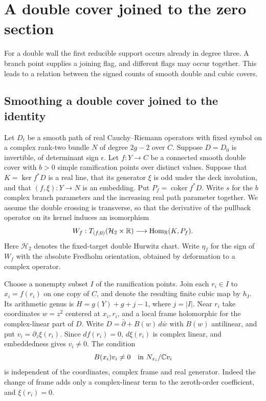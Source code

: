 \section{A double cover joined to the zero section}\label{sec:cubic}
For a double wall the first reducible support occurs already in degree three. A branch point supplies a joining flag, and different flags may occur together. This leads to a relation between the signed counts of smooth double and cubic covers.
\subsection{Smoothing a double cover joined to the identity}\label{p10-sec:nodes}

Let $D_t$ be a smooth path of real Cauchy--Riemann operators with fixed
symbol on a complex rank-two bundle $N$ of degree $2g-2$ over $C$.
Suppose $D=D_0$ is invertible, of determinant sign $\epsilon$.
Let $f:Y\to C$ be a connected smooth double cover with $b>0$ simple
ramification points over distinct values. Suppose that $K=\ker f^*D$
is a real line, that its generator $\xi$ is odd under the deck
involution, and that $(f,\xi):Y\to N$ is an embedding. Put
$P_f=\operatorname{coker}f^*D$. Write $s$ for the $b$ complex branch
parameters and the increasing real path parameter together. We assume
the double crossing is transverse, so that the derivative of the
pullback operator on its kernel induces an isomorphism
\[
  W_f:T_{(f,0)}(\mathcal H_2\times\mathbb R)
          \longrightarrow \operatorname{Hom}_{\mathbb R}(K,P_f).
\]
Here $\mathcal H_2$ denotes the fixed-target double Hurwitz chart.
Write $\eta_f$ for the sign of $W_f$ with the absolute Fredholm
orientation, obtained by deformation to a complex operator.

Choose a nonempty subset $I$ of the ramification points. Join each
$r_i\in I$ to $x_i=f(r_i)$ on one copy of $C$, and denote the resulting
finite cubic map by $h_I$. Its arithmetic genus is
$H=g(Y)+g+j-1$, where $j=|I|$. Near $r_i$ take coordinates
$w=z^2$ centered at $x_i,r_i$, and a local frame holomorphic for the
complex-linear part of $D$. Write $D=\bar\partial+B(w)\,d\bar w$ with
$B(w)$ antilinear, and put $v_i=\partial_z\xi(r_i)$. Since $df(r_i)=0$,
$d\xi(r_i)$ is complex linear, and embeddedness gives $v_i\ne0$.
The condition
\begin{equation}\label{p10-eq:node-jet}
                 B(x_i)v_i\ne 0\quad\text{in }N_{x_i}/\mathbb C v_i
\end{equation}
is independent of the coordinates, complex frame and real generator.
Indeed the change of frame adds only a complex-linear term to the
zeroth-order coefficient, and $\xi(r_i)=0$.

